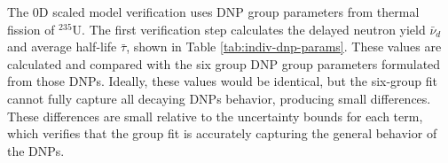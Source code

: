 The 0D scaled model verification uses \gls{DNP} group parameters from thermal fission of $^{235}$U.
The first verification step calculates the delayed neutron yield $\bar{\nu}_{d}$ and average half-life $\bar{\tau}$, shown in Table \ref{tab:indiv-dnp-params}.
These values are calculated and compared with the six group \gls{DNP} group parameters formulated from those \glspl{DNP}.
Ideally, these values would be identical, but the six-group fit cannot fully capture all decaying \glspl{DNP} behavior, producing small differences.
These differences are small relative to the uncertainty bounds for each term, which verifies that the group fit is accurately capturing the general behavior of the \glspl{DNP}.

